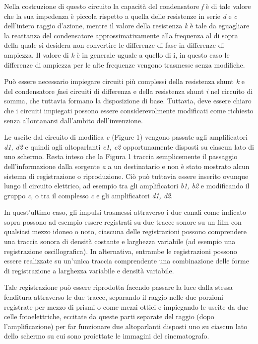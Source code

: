 \documentclass[11pt]{article}
\begin{document}
\begin{multicols*}{2}
Nella costruzione di questo circuito la capacità del condensatore \textit{f} è di tale valore che la sua impedenza è piccola rispetto a quella delle resistenze in serie \textit{d} e \textit{c} dell'intero raggio d’azione, mentre il valore della resistenza \textit{k} è tale da eguagliare la reattanza del condensatore approssimativamente alla frequenza al di sopra della quale si desidera non convertire le differenze di fase in differenze di ampiezza. Il valore di \textit{k} è in generale uguale a quello di i, in questo caso le differenze di ampiezza per le alte frequenze vengono trasmesse senza modifiche.

Può essere necessario impiegare circuiti più complessi della resistenza shunt \textit{k} e del condensatore \textit{f}nei circuiti di differenza e della resistenza shunt \textit{i} nel circuito di somma, che tuttavia formano la disposizione di base. Tuttavia, deve essere chiaro che i circuiti impiegati possono essere considerevolmente modificati come richiesto senza allontanarsi dall'ambito dell’invenzione.

Le uscite dal circuito di modifica \textit{c} (Figure 1) vengono passate agli amplificatori \textit{d1, d2} e quindi agli altoparlanti \textit{e1, e2} opportunamente disposti su ciascun lato di uno schermo. Resta inteso che la Figura 1 traccia semplicemente il passaggio dell'informazione dalla sorgente \textit{a} a un destinatario e non è stato mostrato alcun sistema di registrazione o riproduzione. Ciò può tuttavia essere inserito ovunque lungo il circuito elettrico, ad esempio tra gli amplificatori \textit{b1, b2} e modificando il gruppo \textit{c}, o tra il complesso \textit{c} e gli amplificatori \textit{d1, d2}. 

In quest’ultimo caso, gli impulsi trasmessi attraverso i due canali come indicato sopra possono ad esempio essere registrati su due tracce sonore su un film con qualsiasi mezzo idoneo o noto, ciascuna delle registrazioni possono comprendere una traccia sonora di densità costante e larghezza variabile (ad esempio una registrazione oscillografica). In alternativa, entrambe le registrazioni possono essere realizzate su un’unica traccia comprendente una combinazione delle forme di registrazione a larghezza variabile e densità variabile.

Tale registrazione può essere riprodotta facendo passare la luce dalla stessa fenditura attraverso le due tracce, separando il raggio nelle due porzioni registrate per mezzo di prismi o come mezzi ottici e impiegando le uscite da due celle fotoelettriche, eccitate da queste parti separate del raggio (dopo l’amplificazione) per far funzionare due altoparlanti disposti uno su ciascun lato dello schermo su cui sono proiettate le immagini del cinematografo.


\end{multicols*}
\end{document}
